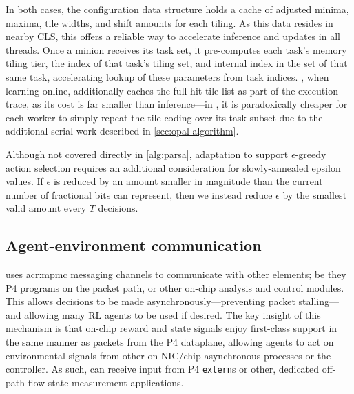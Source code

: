 In both cases, the configuration data structure holds a cache of adjusted minima, maxima, tile widths, and shift amounts for each tiling.
As this data resides in nearby CLS, this offers a reliable way to accelerate inference and updates in all \approachshort{} threads.
Once a \coopfw{} minion receives its task set, it pre-computes each task's memory tiling tier, the index of that task's tiling set, and internal index in the set of that same task, accelerating lookup of these parameters from task indices.
\Indfw{}, when learning online, additionally caches the full hit tile list as part of the execution trace, as its cost is far smaller than inference---in \Coopfw, it is paradoxically cheaper for each worker to simply repeat the tile coding over its task subset due to the additional serial work described in \cref{sec:opal-algorithm}.

Although not covered directly in \cref{alg:parsa}, adaptation to support $\epsilon$-greedy action selection requires an additional consideration for slowly-annealed epsilon values.
If $\epsilon$ is reduced by an amount smaller in magnitude than the current number of fractional bits can represent, then we instead reduce $\epsilon$ by the smallest valid amount every $T$ decisions.


\subsection{Agent-environment communication}\label{sec:agent-environment-communication}
\approachshort{} uses \gls{acr:mpmc} messaging channels to communicate with other elements; be they P4 programs on the packet path, or other on-chip analysis and control modules.
This allows decisions to be made asynchronously---preventing packet stalling---and allowing many RL agents to be used if desired.
The key insight of this mechanism is that on-chip reward and state signals enjoy first-class support in the same manner as packets from the P4 dataplane, allowing agents to act on environmental signals from other on-NIC/chip asynchronous processes or the controller.
As such, \approachshort{} can receive input from P4 \texttt{extern}s or other, dedicated off-path flow state measurement applications.

